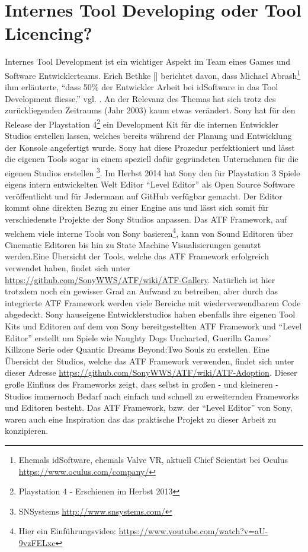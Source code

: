 \documentclass[pagesize, paper=a4, fontsize=12pt, titlepage=true, headings=small, headnosepline, abstractoff, liststotoc, nochapterprefix, plainheadsepline, twoside]{scrreprt}
\begin{document}
\section{Internes Tool Developing oder Tool Licencing?}
Internes Tool Development ist ein wichtiger Aspekt im Team eines Games und Software Entwicklerteams. Erich Bethke [] berichtet davon, dass Michael Abrash\footnote{Ehemals idSoftware, ehemals Valve VR, aktuell Chief Scientist bei Oculus \url{https://www.oculus.com/company/}} ihm erläuterte, “dass 50\% der Entwickler Arbeit bei idSoftware in das Tool Development fliesse.” vgl. \cite[S. 44]{Bethke2003}. An der Relevanz des Themas hat sich trotz des zurückliegenden Zeitraums (Jahr 2003) kaum etwas verändert. Sony hat für den Release der Playstation 4\footnote{Playstation 4 - Erschienen im Herbst 2013} ein Development Kit  für die internen Entwickler Studios  erstellen lassen, welches bereits während der Planung und Entwicklung der Konsole angefertigt wurde. Sony hat diese Prozedur perfektioniert und lässt die eigenen Tools sogar in einem speziell dafür gegründeten Unternehmen für die eigenen Studios erstellen \footnote{SNSystems \url{http://www.snsystems.com/}}. Im Herbst 2014 hat Sony den für Playstation 3 Spiele eigens intern entwickelten Welt Editor “Level Editor” als Open Source Software veröffentlicht und für Jedermann auf GitHub verfügbar gemacht. Der Editor kommt ohne direkten Bezug zu einer Engine aus und lässt sich somit für verschiedenste Projekte der Sony Studios anpassen. Das ATF Framework, auf welchem viele interne Tools von Sony basieren\footnote{Hier ein Einführungsvideo: \url{https://www.youtube.com/watch?v=aU-9vzFELxc}}, kann von Sound Editoren über Cinematic Editoren bis hin zu State Machine Visualisierungen genutzt werden.Eine Übersicht der Tools, welche das ATF Framework erfolgreich verwendet haben, findet sich unter \url{https://github.com/SonyWWS/ATF/wiki/ATF-Gallery}. Natürlich ist hier trotzdem noch ein gewisser Grad an Aufwand zu betreiben, aber durch das integrierte ATF Framework werden viele Bereiche mit wiederverwendbarem Code abgedeckt. Sony hauseigene Entwicklerstudios haben ebenfalls ihre eigenen Tool Kits und Editoren auf dem von Sony bereitgestellten ATF Framework und “Level Editor” erstellt um Spiele wie Naughty Dogs Uncharted, Guerilla Games’ Killzone Serie oder Quantic Dreams Beyond:Two Souls zu erstellen. Eine Übersicht der Studios, welche das ATF Framework verwenden, findet sich unter dieser Adresse \url{https://github.com/SonyWWS/ATF/wiki/ATF-Adoption}. Dieser große Einfluss des Frameworks zeigt, dass selbst in großen - und kleineren - Studios immernoch Bedarf nach einfach und schnell zu erweiternden Frameworks und Editoren besteht. Das ATF Framework, bzw. der “Level Editor” von Sony, waren auch eine Inspiration das das praktische Projekt zu dieser Arbeit zu konzipieren.
\end{document}
